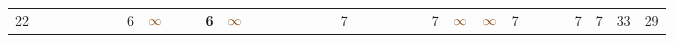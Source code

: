 \begin{landscape}
\begin{table}
\begin{adjustwidth}{-2.6cm}{}
{\begin{tabular}{l|lllllllllllllllllllllllllllllllll|ll}
		22   &            &                                                                 &                                                                 &                                                                 &                                                                 &                                                                 & 6                                                               & $\textcolor[rgb]{0.541,0.29,0.043}{\infty}$ &                                                                 &                                                                 & \textbf{6}                                                      & $\textcolor[rgb]{0.541,0.29,0.043}{\infty}$ &                                                                 &                                                                 &                                                                 &                                                                 &                                                                 &                                                                 & 7                                                               &                                                                 &                                                                 &                                                                 &                                                                 &                                                                 & 7                                                               & $\textcolor[rgb]{0.541,0.29,0.043}{\infty}$ & $\textcolor[rgb]{0.541,0.29,0.043}{\infty}$ & 7                                                               &                                                                 &                                                                 &                                                                 & 7                                                               & 7                                                               & 33         & 29          \\

\end{tabular}}
\end{adjustwidth}
\end{table}
\end{landscape}
